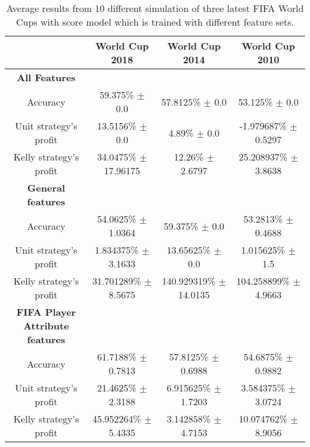 \begin{sidewaystable}
    \caption{Average results from 10 different simulation of three latest FIFA World Cups with score model which is trained with different feature sets.}
    \begin{tabular}{ | c |c| c | c |}
    \hline
    & World Cup 2018 & World Cup 2014 & World Cup 2010 \\
    \hline
    \textbf{All Features} \\
    \hline
    Accuracy & 59.375\% $\pm$ 0.0 & 57.8125\% $\pm$ 0.0 & 53.125\% $\pm$ 0.0 \\
    Unit strategy's profit & 13.5156\% $\pm$ 0.0 & 4.89\%  $\pm$ 0.0 & -1.979687\% $\pm$ 0.5297 \\
    Kelly strategy's profit & 34.0475\% $\pm$ 17.96175 & 12.26\% $\pm$ 2.6797 & 25.208937\% $\pm$ 3.8638 \\
    \hline
    \textbf{General features} \\
    \hline
    Accuracy & 54.0625\% $\pm$ 1.0364 & 59.375\% $\pm$ 0.0 & 53.2813\% $\pm$ 0.4688 \\
    Unit strategy's profit & 1.834375\% $\pm$ 3.1633 & 13.65625\% $\pm$ 0.0 & 1.015625\% $\pm$ 1.5 \\
    Kelly strategy's profit & 31.701289\% $\pm$ 8.5675 & 140.929319\% $\pm$ 14.0135 & 104.258899\% $\pm$ 4.9663 \\
    \hline
    \textbf{FIFA Player Attribute features} \\
    \hline
    Accuracy & 61.7188\% $\pm$ 0.7813 & 57.8125\% $\pm$ 0.6988 & 54.6875\% $\pm$ 0.9882 \\
    Unit strategy's profit & 21.4625\% $\pm$ 2.3188 & 6.915625\% $\pm$ 1.7203 & 3.584375\% $\pm$ 3.0724 \\
    Kelly strategy's profit & 45.952264\% $\pm$ 5.4335 & 3.142858\% $\pm$ 4.7153 & 10.074762\% $\pm$ 8.9056 \\
    \hline
   \end{tabular}
\end{sidewaystable}